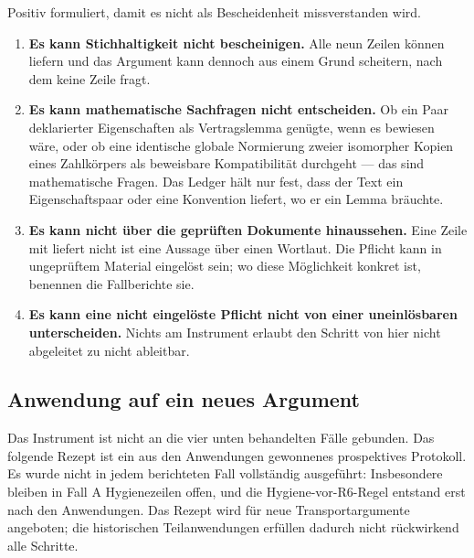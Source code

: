 \documentclass[11pt,a4paper]{article}
\theoremstyle{definition}
\begin{document}
Positiv formuliert, damit es nicht als Bescheidenheit missverstanden wird.

\begin{enumerate}
\item \textbf{Es kann Stichhaltigkeit nicht bescheinigen.} Alle neun Zeilen können
  liefern und das Argument kann dennoch aus einem Grund scheitern, nach dem keine
  Zeile fragt.
\item \textbf{Es kann mathematische Sachfragen nicht entscheiden.} Ob ein Paar
  deklarierter Eigenschaften als Vertragslemma genügte, wenn es bewiesen wäre,
  oder ob eine identische globale Normierung zweier isomorpher Kopien eines
  Zahlkörpers als beweisbare Kompatibilität durchgeht --- das sind mathematische
  Fragen. Das Ledger hält nur fest, dass der Text ein Eigenschaftspaar oder eine
  Konvention liefert, wo er ein Lemma bräuchte.
\item \textbf{Es kann nicht über die geprüften Dokumente hinaussehen.} Eine Zeile
  mit \glqq liefert nicht\grqq{} ist eine Aussage über einen Wortlaut. Die Pflicht kann in
  ungeprüftem Material eingelöst sein; wo diese Möglichkeit konkret ist, benennen
  die Fallberichte sie.
\item \textbf{Es kann eine nicht eingelöste Pflicht nicht von einer uneinlösbaren
  unterscheiden.} Nichts am Instrument erlaubt den Schritt von \glqq hier nicht
  abgeleitet\grqq{} zu \glqq nicht ableitbar\grqq.
\end{enumerate}

\subsection{Anwendung auf ein neues Argument}
\label{sec:recipe}

Das Instrument ist nicht an die vier unten behandelten Fälle gebunden. Das
folgende Rezept ist ein aus den Anwendungen gewonnenes prospektives Protokoll.
Es wurde nicht in jedem berichteten Fall vollständig ausgeführt: Insbesondere
bleiben in Fall A Hygienezeilen offen, und die Hygiene-vor-R6-Regel entstand
erst nach den Anwendungen. Das Rezept wird für neue Transportargumente angeboten;
die historischen Teilanwendungen erfüllen dadurch nicht rückwirkend alle Schritte.
\end{document}
